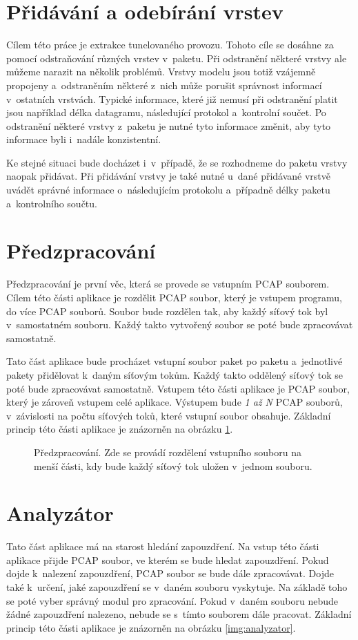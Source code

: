 \section{Přidávání a odebírání vrstev}
Cílem této práce je extrakce tunelovaného provozu. Tohoto cíle se dosáhne za pomocí odstraňování různých vrstev v~paketu. Při odstranění některé vrstvy ale můžeme narazit na několik problémů. Vrstvy modelu jsou totiž vzájemně propojeny a~odstraněním některé z~nich může porušit správnost informací v~ostatních vrstvách. Typické informace, které již nemusí při odstranění platit jsou například délka datagramu, následující protokol a~kontrolní součet. Po odstranění některé vrstvy z~paketu je nutné tyto informace změnit, aby tyto informace byli i~nadále konzistentní.

Ke stejné situaci bude docházet i~v~případě, že se rozhodneme do paketu vrstvy naopak přidávat. Při přidávání vrstvy je také nutné u~dané přidávané vrstvě uvádět správné informace o~následujícím protokolu a~případně délky paketu a~kontrolního součtu. 

\section{Předzpracování}
\label{sec:predzpracovani}
Předzpracování je první věc, která se provede se vstupním PCAP souborem. Cílem této části aplikace je rozdělit PCAP soubor, který je vstupem programu, do více PCAP souborů. Soubor bude rozdělen tak, aby každý síťový tok byl v~samostatném souboru. Každý takto vytvořený soubor se poté bude zpracovávat samostatně.

Tato část aplikace bude procházet vstupní soubor paket po paketu a~jednotlivé pakety přidělovat k~daným síťovým tokům. Každý takto oddělený síťový tok se poté bude zpracovávat samostatně. Vstupem této části aplikace je PCAP soubor, který je zároveň vstupem celé aplikace. Výstupem bude \emph{1 až N} PCAP souborů, v~závislosti na počtu síťových toků, které vstupní soubor obsahuje. Základní princip této části aplikace je znázorněn na obrázku \ref{img:predzpracovani}.

\begin{figure}[H]
    \centering
    \caption{Předzpracování. Zde se provádí rozdělení vstupního souboru na menší části, kdy bude každý síťový tok uložen v~jednom souboru.}
    \label{img:predzpracovani}
\end{figure}

\section{Analyzátor}
\label{sec:analyzator}
Tato část aplikace má na starost hledání zapouzdření. Na vstup této části aplikace přijde PCAP soubor, ve kterém se bude hledat zapouzdření. Pokud dojde k~nalezení zapouzdření, PCAP soubor se bude dále zpracovávat. Dojde také k~určení, jaké zapouzdření se v~daném souboru vyskytuje. Na základě toho se poté vyber správný modul pro zpracování. Pokud v~daném souboru nebude žádné zapouzdření nalezeno, nebude se s~tímto souborem dále pracovat. Základní princip této části aplikace je znázorněn na obrázku \ref{img:analyzator}.

